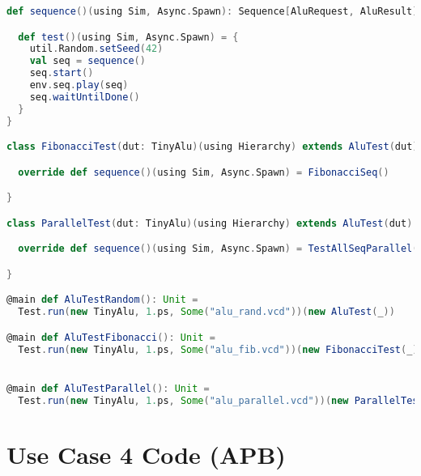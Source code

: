 \begin{lstlisting}[language=scala, captionpos=b, caption=Test code for the tiny ALU.,label=lst:alu_test]
  def sequence()(using Sim, Async.Spawn): Sequence[AluRequest, AluResult] = RandomSeq()

  def test()(using Sim, Async.Spawn) = {
    util.Random.setSeed(42)
    val seq = sequence()
    seq.start()
    env.seq.play(seq)
    seq.waitUntilDone()
  }
}

class FibonacciTest(dut: TinyAlu)(using Hierarchy) extends AluTest(dut) {

  override def sequence()(using Sim, Async.Spawn) = FibonacciSeq()

}

class ParallelTest(dut: TinyAlu)(using Hierarchy) extends AluTest(dut) {

  override def sequence()(using Sim, Async.Spawn) = TestAllSeqParallel()

}

@main def AluTestRandom(): Unit =
  Test.run(new TinyAlu, 1.ps, Some("alu_rand.vcd"))(new AluTest(_))

@main def AluTestFibonacci(): Unit =
  Test.run(new TinyAlu, 1.ps, Some("alu_fib.vcd"))(new FibonacciTest(_))


@main def AluTestParallel(): Unit =
  Test.run(new TinyAlu, 1.ps, Some("alu_parallel.vcd"))(new ParallelTest(_))
\end{lstlisting}  




\newpage

\section{Use Case 4 Code (APB)} %
\label{sec:apb_test}

